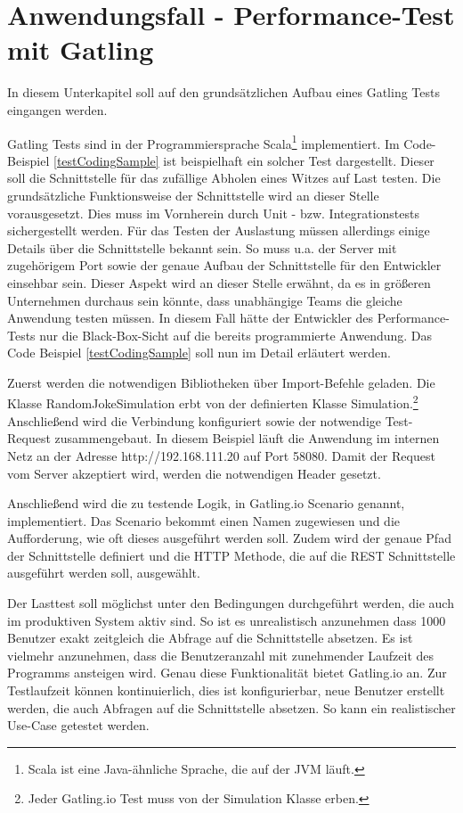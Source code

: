 \section{Anwendungsfall - Performance-Test mit Gatling}
\label{sec:testWithGatlingExample}
In diesem Unterkapitel soll auf den grundsätzlichen Aufbau eines Gatling Tests eingangen werden.

Gatling Tests sind in der Programmiersprache Scala\footnote{{} Scala ist eine Java-ähnliche Sprache, die auf der \ac{JVM} läuft.} implementiert.
Im Code-Beispiel \ref{testCodingSample} ist beispielhaft ein solcher Test dargestellt.
Dieser soll die Schnittstelle für das zufällige Abholen eines Witzes auf Last testen.
Die grundsätzliche Funktionsweise der Schnittstelle wird an dieser Stelle vorausgesetzt.
Dies muss im Vornherein durch Unit - bzw. Integrationstests sichergestellt werden.
Für das Testen der Auslastung müssen allerdings einige Details über die Schnittstelle bekannt sein.
So muss u.a. der Server mit zugehörigem Port sowie der genaue Aufbau der Schnittstelle für den Entwickler einsehbar sein.
Dieser Aspekt wird an dieser Stelle erwähnt, da es in größeren Unternehmen durchaus sein könnte, dass unabhängige Teams die gleiche Anwendung testen müssen.
In diesem Fall hätte der Entwickler des Performance-Tests nur die Black-Box-Sicht auf die bereits programmierte Anwendung.
Das Code Beispiel \ref{testCodingSample} soll nun im Detail erläutert werden.

Zuerst werden die notwendigen Bibliotheken über \glqq Import-Befehle\grqq{} geladen.
Die Klasse \glqq RandomJokeSimulation\grqq{} erbt von der definierten Klasse \glqq Simulation\grqq{}.\footnote{{} Jeder Gatling.io Test muss von der Simulation Klasse erben.}
Anschließend wird die Verbindung konfiguriert sowie der notwendige Test-Request zusammengebaut.
In diesem Beispiel läuft die Anwendung im internen Netz an der Adresse \glqq http://192.168.111.20\grqq{} auf Port 58080.
Damit der Request vom Server akzeptiert wird, werden die notwendigen Header gesetzt.

Anschließend wird die zu testende Logik, in Gatling.io \glqq Scenario\grqq{} genannt, implementiert.
Das Scenario bekommt einen Namen zugewiesen und die Aufforderung, wie oft dieses ausgeführt werden soll.
Zudem wird der genaue Pfad der Schnittstelle definiert und die \ac{HTTP} Methode, die auf die \ac{REST} Schnittstelle ausgeführt werden soll, ausgewählt.

Der Lasttest soll möglichst unter den Bedingungen durchgeführt werden, die auch im produktiven System aktiv sind.
So ist es unrealistisch anzunehmen dass 1000 Benutzer exakt zeitgleich die Abfrage auf die Schnittstelle absetzen.
Es ist vielmehr anzunehmen, dass die Benutzeranzahl mit zunehmender Laufzeit des Programms ansteigen wird.
Genau diese Funktionalität bietet Gatling.io an.
Zur Testlaufzeit können kontinuierlich, dies ist konfigurierbar, neue Benutzer erstellt werden, die auch Abfragen auf die Schnittstelle absetzen.
So kann ein realistischer Use-Case getestet werden.

